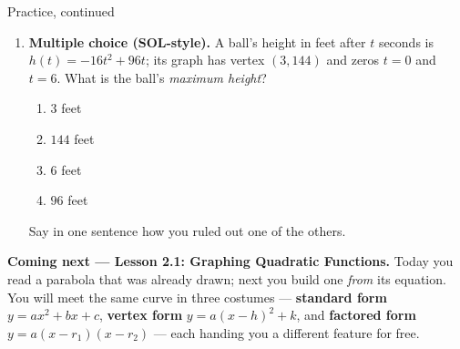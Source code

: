 \documentclass[12pt]{article}
\begin{document}
\begin{notesbox}{Practice, continued}
\begin{enumerate}[leftmargin=1.9em, itemsep=7pt, start=4]
  \item \textbf{Multiple choice (SOL-style).} A ball's height in feet after $t$ seconds is
        $h(t)=-16t^2+96t$; its graph has vertex $(3,144)$ and zeros $t=0$ and $t=6$. What is the
        ball's \emph{maximum height}?
    \begin{enumerate}[label=\Alph*., leftmargin=2.2em, itemsep=0pt, topsep=2pt]
      \item {}$3$ feet
      \item $144$ feet
      \item $6$ feet
      \item $96$ feet
    \end{enumerate}
    Say in one sentence how you ruled out one of the others. 
\end{enumerate}
\end{notesbox}

\vspace{0.08in}

\boxguard[8]
\begin{spiralbox}
\small
\textbf{Coming next --- Lesson 2.1: Graphing Quadratic Functions.} Today you read a parabola that
was already drawn; next you build one \emph{from} its equation. You will meet the same curve in
three costumes --- \textbf{standard form} $y=ax^2+bx+c$, \textbf{vertex form} $y=a(x-h)^2+k$, and
\textbf{factored form} $y=a(x-r_1)(x-r_2)$ --- each handing you a different feature for free.
\end{spiralbox}
\end{document}

